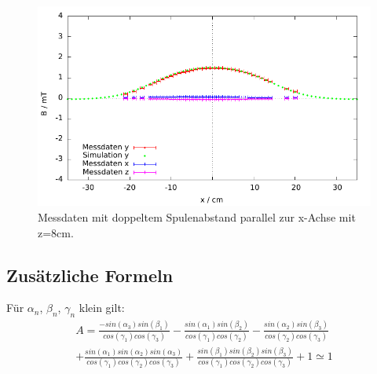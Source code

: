 \documentclass[12pt,a4paper]{article}
\begin{document}
\begin{figure}[H]
	\centering
	\includegraphics[scale=1]{abs22.pdf}
	\caption{Messdaten mit doppeltem Spulenabstand parallel zur x-Achse mit z=8cm.}
	\label{fig:p8}
\end{figure}
\newpage
\subsection{Zusätzliche Formeln}
\label{eq_formeln}
Für $\alpha _n$, $\beta _n$, $\gamma _n$ klein gilt:
\begin{align}
\label{eq:e1}
 \nonumber A=\frac{-sin(\alpha_3) sin(\beta_1)}{cos(\gamma_1) cos(\gamma_3)}-\frac{sin(\alpha_1) sin(\beta_2)}{cos(\gamma_1) cos(\gamma_2)}-\frac{sin(\alpha_2) sin(\beta_3)}{cos(\gamma_2) cos(\gamma_3)}\\
 +\frac{sin(\alpha_1) sin(\alpha_2) sin(\alpha_3)}{cos(\gamma_1) cos(\gamma_2) cos(\gamma_3)}+\frac{sin(\beta_1) sin(\beta_2) sin(\beta_3)}{cos(\gamma_1) cos(\gamma_2) cos(\gamma_3)}+1 \simeq 1
\end{align}
\newpage
{}

\end{document}
